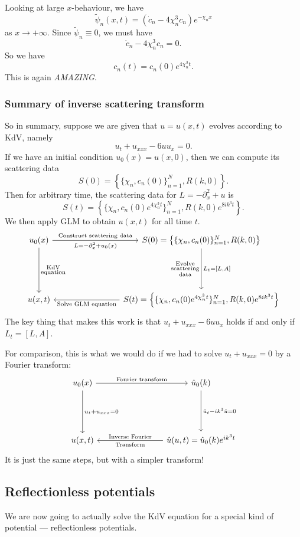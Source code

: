 \documentclass[a4paper]{article}
\begin{document}
Looking at large $x$-behaviour, we have
\[
  \tilde{\psi}_n(x, t) = (\dot{c}_n - 4 \chi_n^3 c_n) e^{- \chi_n x}
\]
as $x \to +\infty$. Since $\tilde{\psi}_n \equiv 0$, we must have
\[
  \dot{c}_n - 4 \chi_n^3 c_n = 0.
\]
So we have
\[
  c_n(t) = c_n(0) e^{4 \chi_n^3 t}.
\]
This is again \emph{AMAZING}.

\subsubsection{Summary of inverse scattering transform}
So in summary, suppose we are given that $u = u(x, t)$ evolves according to KdV, namely
\[
  u_t + u_{xxx} - 6uu_x = 0.
\]
If we have an initial condition $u_0(x) = u(x, 0)$, then we can compute its scattering data
\[
  S(0) = \left\{\{\chi_n, c_n(0)\}_{n = 1}^N, R(k, 0)\right\}.
\]
Then for arbitrary time, the scattering data for $L = -\partial_x^2 + u$ is
\[
  S(t) = \left\{\{\chi_n, c_n(0)e^{4\chi_n^3 t}\}_{n = 1}^N, R(k, 0)e^{8ik^3 t}\right\}.
\]
We then apply GLM to obtain $u(x, t)$ for all time $t$.
\[
  \begin{tikzcd}[row sep=5em, column sep=8em]
    u_0(x) \ar[r, "\text{Construct scattering data}", "L = -\partial_x^2 + u_0(x)"'] \ar[d, "\substack{\text{KdV}\\\text{equation}}"] & S(0) = \left\{\{\chi_n, c_n(0)\}_{n = 1}^N, R(k, 0)\right\} \ar[d, "\substack{\text{Evolve}\\\text{scattering}\\\text{data}}"', "{L_t = [L, A]}"]\\
    u(x, t) & S(t) = \left\{\{\chi_n, c_n(0)e^{4\chi_n^3 t}\}_{n = 1}^N, R(k, 0)e^{8ik^3 t}\right\} \ar[l, "\text{Solve GLM equation}"]
  \end{tikzcd}
\]
The key thing that makes this work is that $u_t + u_{xxx} - 6 uu_x$ holds if and only if $L_t = [L, A]$.

For comparison, this is what we would do if we had to solve $u_t + u_{xxx} = 0$ by a Fourier transform:
\[
  \begin{tikzcd}[row sep=5em, column sep=8em]
    u_0(x) \ar[r, "\text{Fourier transform}"] \ar[d, "u_t + u_{xxx} = 0"] & \hat{u}_0(k) \ar[d, "\hat{u}_t - ik^3 \hat{u} = 0"]\\
    u(x, t) & \hat{u}(u, t) = \hat{u}_0(k) e^{ik^3 t} \ar[l, "\text{Inverse Fourier}"', "\text{Transform}"]
  \end{tikzcd}
\]
It is just the same steps, but with a simpler transform!

\subsection{Reflectionless potentials}
We are now going to actually solve the KdV equation for a special kind of potential --- reflectionless potentials.
\end{document}
